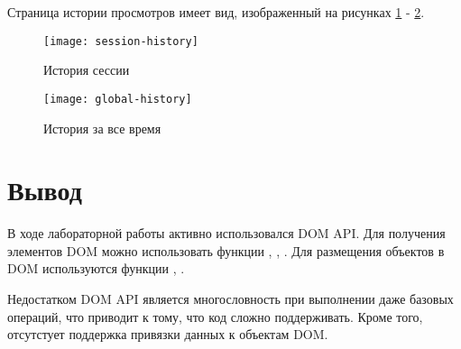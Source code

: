 \documentclass[a4paper,14pt]{extarticle}
\begin{document}
Страница истории просмотров имеет вид, изображенный на рисунках \ref{fig:session-history} - \ref{fig:global-history}.

\begin{figure}[H]
    \centering
    \texttt{[image: session-history]}
    \caption{История сессии}
    \label{fig:session-history}
\end{figure}

\begin{figure}[H]
    \centering
    \texttt{[image: global-history]}
    \caption{История за все время}
    \label{fig:global-history}
\end{figure}

\section*{Вывод}
В ходе лабораторной работы активно использовался DOM API. Для получения элементов DOM можно использовать функции
, , . Для размещения объектов 
в DOM используются функции , .

Недостатком DOM API является многословность при выполнении даже базовых операций, что приводит к тому, что код сложно
поддерживать. Кроме того, отсутстует поддержка привязки данных к объектам DOM.
\end{document}

